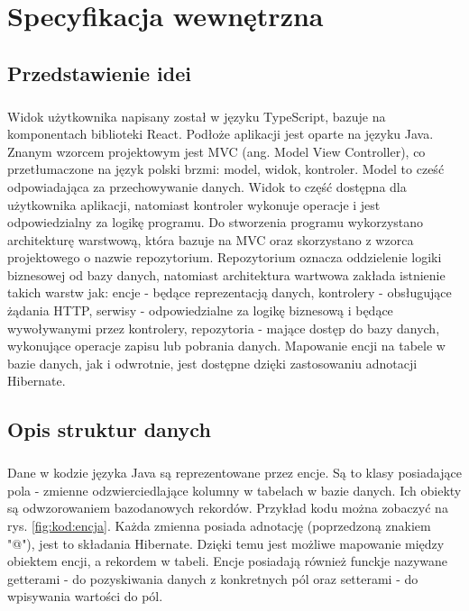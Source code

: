 \chapter{Specyfikacja wewnętrzna}
\label{ch:05}

\section{Przedstawienie idei}
\paragraph{}
Widok użytkownika napisany został w języku TypeScript, bazuje na komponentach biblioteki React. Podłoże aplikacji jest oparte na języku Java. Znanym wzorcem projektowym jest MVC (ang. Model View Controller), co przetłumaczone na język polski brzmi: model, widok, kontroler. Model to cześć odpowiadająca za przechowywanie danych. Widok to część dostępna dla użytkownika aplikacji, natomiast kontroler wykonuje operacje i jest odpowiedzialny za logikę programu. Do stworzenia programu wykorzystano architekturę warstwową, która bazuje na MVC oraz skorzystano z wzorca projektowego o nazwie repozytorium. Repozytorium oznacza oddzielenie logiki biznesowej od bazy danych, natomiast architektura wartwowa zakłada istnienie takich warstw jak: encje - będące reprezentacją danych, kontrolery - obsługujące żądania HTTP, serwisy - odpowiedzialne za logikę biznesową i będące wywoływanymi przez kontrolery, repozytoria - mające dostęp do bazy danych, wykonujące operacje zapisu lub pobrania danych. Mapowanie encji na tabele w bazie danych, jak i odwrotnie, jest dostępne dzięki zastosowaniu adnotacji Hibernate.

\section{Opis struktur danych}
\paragraph{}
Dane w kodzie języka Java są reprezentowane przez encje. Są to klasy posiadające pola - zmienne odzwierciedlające kolumny w tabelach w bazie danych. Ich obiekty są odwzorowaniem bazodanowych rekordów. Przykład kodu można zobaczyć na rys. \ref{fig:kod:encja}. Każda zmienna posiada adnotację (poprzedzoną znakiem "@"), jest to składania Hibernate. Dzięki temu jest możliwe mapowanie między obiektem encji, a rekordem w tabeli. Encje posiadają również funckje nazywane getterami - do pozyskiwania danych z konkretnych pól oraz setterami - do wpisywania wartości do pól.

